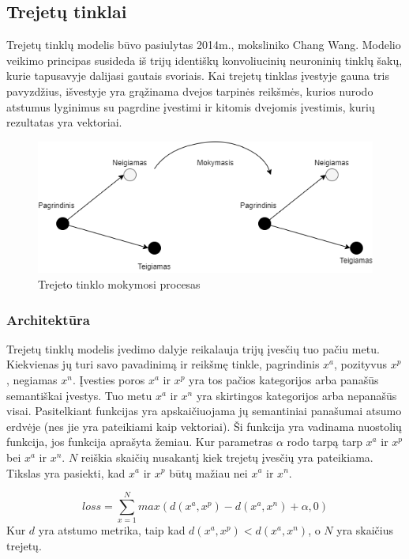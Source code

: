 \documentclass{VUMIFPSkursinis}
\begin{document}
\subsection{Trejetų tinklai}
Trejetų tinklų modelis būvo pasiulytas 2014m., moksliniko Chang Wang\cite{Triplet_Network}. Modelio veikimo principas susideda iš trijų identiškų konvoliucinių neuroninių tinklų šakų, kurie tapusavyje dalijasi gautais svoriais. Kai trejetų tinklas įvestyje gauna tris pavyzdžius, išvestyje yra grąžinama dvejos tarpinės reikšmės, kurios nurodo atstumus lyginimus su pagrdine įvestimi ir kitomis dvejomis įvestimis, kurių rezultatas yra vektoriai.
\begin{figure}[H]
\centering
\includegraphics[scale=0.5]{img/Triplet_network}
\caption{Trejeto tinklo mokymosi procesas \cite{Improved_triplet_network}} %
\label{img:mlp}
\end{figure}
\pagebreak

\subsubsection{Architektūra}
Trejetų tinklų modelis įvedimo dalyje reikalauja trijų įvesčių tuo pačiu metu. Kiekvienas jų turi savo pavadinimą ir reikšmę tinkle, pagrindinis $x^a$, pozityvus $x^p$, negiamas $x^n$. Įvesties poros $x^a$ ir $x^p$ yra tos pačios kategorijos arba panašūs semantiškai įvestys. Tuo metu $x^a$ ir $x^n$ yra skirtingos kategorijos arba nepanašūs visai. Pasitelkiant funkcijas yra apskaičiuojama jų semantiniai panašumai atsumo erdvėje (nes jie yra pateikiami kaip vektoriai). Ši funkcija yra vadinama nuostolių funkcija, jos funkcija aprašyta žemiau. Kur parametras $\alpha$ rodo tarpą tarp $x^a$ ir $x^p$ bei $x^a$ ir $x^n$. $N$ reiškia skaičių nusakantį kiek trejetų įvesčių yra pateikiama. Tikslas yra pasiekti, kad $x^a$ ir $x^p$ būtų mažiau nei $x^a$ ir $x^n$.

\[loss = \sum_{x=1}^{N} max(d(x^a, x^p) - d(x^a, x^n) + \alpha, 0)\]
Kur $d$ yra atstumo metrika, taip kad $d(x^a, x^p) < d(x^a, x^n)$, o $N$ yra skaičius trejetų.
\end{document}
